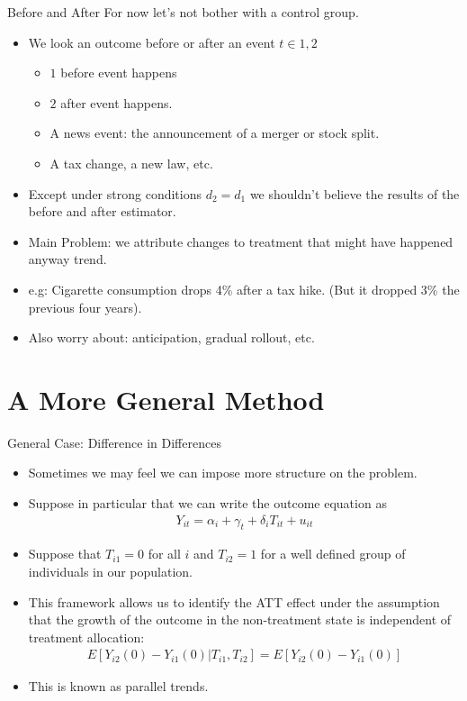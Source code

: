 \documentclass[xcolor=pdftex,dvipsnames,table,mathserif,aspectratio=169]{beamer}
\begin{document}
\begin{frame}{Before and After} 
For now let's not bother with a \alert{control group}.
\begin{itemize}
\item We look an outcome before or after an event $t \in {1,2}$
\begin{itemize}
\item $1$ \alert{before} event happens
\item $2$ \alert{after} event happens.
\end{itemize}

\begin{itemize}
\item A news event: the announcement of a merger or stock split.
\item A tax change, a new law, etc.
\end{itemize}
\item Except under strong conditions $d_2 = d_1$ we shouldn't believe the results of the before and after estimator.
\item Main Problem: we attribute changes to treatment that might have happened anyway \alert{trend}.
\item e.g: Cigarette consumption drops 4\% after a tax hike. (But it dropped 3\% the previous four years).
\item Also worry about: \alert{anticipation}, \alert{gradual rollout}, etc.
\end{itemize}
\end{frame}


\section{A More General Method}
\begin{frame}{General Case: Difference in Differences }
\begin{itemize}
\item Sometimes we may feel we can impose more structure on the problem.
\item Suppose in particular that we can write the outcome equation as
\begin{align*}
 Y_{it} =\alpha_i +\gamma_t +\delta_i T_{it}  + u_{it}
 \end{align*}
\item Suppose that $T_{i1}=0$ for all $i$ and $T_{i2}=1$ for a well defined group of individuals in our population.
\item This framework allows us to identify the ATT effect under the assumption that the growth of the outcome in the non-treatment state is independent of treatment allocation:
\begin{align*}
E[Y_{i2}(0) - Y_{i1}(0) | T_{i1}, T_{i2}] = E[Y_{i2}(0) - Y_{i1}(0)] 
\end{align*}
\item This is known as \alert{parallel trends}.
\end{itemize}
\end{frame}
\end{document}
